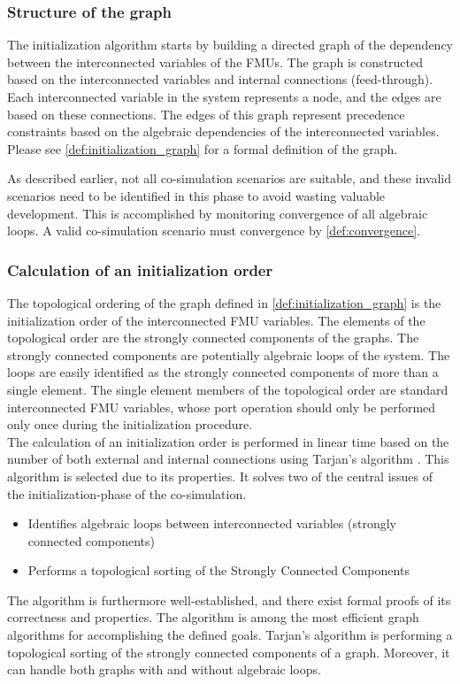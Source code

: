 \subsubsection{Structure of the graph}
The initialization algorithm starts by building a directed graph of the dependency between the interconnected variables of the FMUs. The graph is constructed based on the interconnected variables and internal connections (feed-through). Each interconnected variable in the system represents a node, and the edges are based on these connections. The edges of this graph represent precedence constraints based on the algebraic dependencies of the interconnected variables. Please see \cref{def:initialization_graph} for a formal definition of the graph.

As described earlier, not all co-simulation scenarios are suitable, and these invalid scenarios need to be identified in this phase to avoid wasting valuable development. This is accomplished by monitoring convergence of all algebraic loops. A valid co-simulation scenario must convergence by \cref{def:convergence}.

\subsubsection{Calculation of an initialization order}
The topological ordering of the graph defined in \cref{def:initialization_graph} is the initialization order of the interconnected FMU variables. The elements of the topological order are the strongly connected components of the graphs. The strongly connected components are potentially algebraic loops of the system. The loops are easily identified as the strongly connected components of more than a single element. The single element members of the topological order are standard interconnected FMU variables, whose port operation should only be performed only once during the initialization procedure. \\
The calculation of an initialization order is performed in linear time based on the number of both external and internal connections using Tarjan's algorithm \cite{tarjan_1972}. This algorithm is selected due to its properties. It solves two of the central issues of the initialization-phase of the co-simulation.
\begin{itemize}
    \item Identifies algebraic loops between interconnected variables (strongly connected components)
    \item Performs a topological sorting of the Strongly Connected Components
\end{itemize}
The algorithm is furthermore well-established, and there exist formal proofs of its correctness and properties\cite{stefanMerz}. The algorithm is among the most efficient graph algorithms for accomplishing the defined goals.  
Tarjan's algorithm is performing a topological sorting of the strongly connected components of a graph. Moreover, it can handle both graphs with and without algebraic loops.

